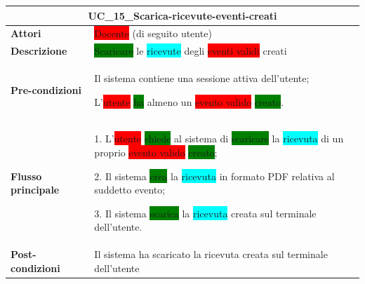 \documentclass[11pt]{article}
\begin{document}
\begin{table}[H]
\centering
\begin{tabularx}{1\textwidth}{|l|X|}
\hline
\multicolumn{2}{|c|}{\textbf{UC\_15\_Scarica-ricevute-eventi-creati}}\\
\hline \textbf{Attori} & \colorbox{red}{Docente} (di seguito utente)\\
\hline \textbf{Descrizione} & \colorbox{green}{Scaricare} le \colorbox{cyan}{ricevute} degli \colorbox{red}{eventi validi} creati\\
\hline \textbf{Pre-condizioni} &
Il sistema contiene una sessione attiva dell'utente;

L'\colorbox{red}{utente} \colorbox{green}{ha} almeno un \colorbox{red}{evento valido} \colorbox{green}{creato}.
\\
\hline \textbf{Flusso principale} & 
1. L'\colorbox{red}{utente} \colorbox{green}{chiede} al sistema di \colorbox{green}{scaricare} la \colorbox{cyan}{ricevuta} di un proprio \colorbox{red}{evento valido} \colorbox{green}{creato};

2. Il sistema \colorbox{green}{crea} la \colorbox{cyan}{ricevuta} in formato PDF relativa al suddetto evento;

3. Il sistema \colorbox{green}{scarica} la \colorbox{cyan}{ricevuta} creata sul terminale dell'utente.
\\
\hline \textbf{Post-condizioni} & Il sistema ha scaricato la ricevuta creata sul terminale dell'utente\\
\hline
\end{tabularx}
\end{table}
\end{document}

